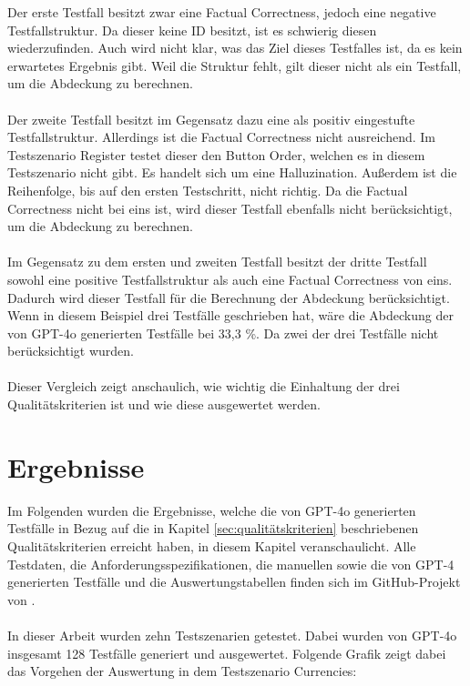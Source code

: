 \documentclass[12pt,toc=bib,toc=listof]{scrreprt}
\begin{document}
\noindent Der erste Testfall besitzt zwar eine Factual Correctness, jedoch eine negative Testfallstruktur. Da dieser keine ID besitzt, ist es schwierig diesen wiederzufinden. Auch wird nicht klar, was das Ziel dieses Testfalles ist, da es kein erwartetes Ergebnis gibt. Weil die Struktur fehlt, gilt dieser nicht als ein Testfall, um die Abdeckung zu berechnen.\\
\\
Der zweite Testfall besitzt im Gegensatz dazu eine als positiv eingestufte Testfallstruktur. Allerdings ist die Factual Correctness nicht ausreichend. Im Testszenario Register testet dieser den Button \glqq Order\grqq, welchen es in diesem Testszenario nicht gibt. Es handelt sich um eine Halluzination. Außerdem ist die Reihenfolge, bis auf den ersten Testschritt, nicht richtig. Da die Factual Correctness nicht bei eins ist, wird dieser Testfall ebenfalls nicht berücksichtigt, um die Abdeckung zu berechnen.\\
\\
Im Gegensatz zu dem ersten und zweiten Testfall besitzt der dritte Testfall sowohl eine positive Testfallstruktur als auch eine Factual Correctness von eins. Dadurch wird dieser Testfall für die Berechnung der Abdeckung berücksichtigt. Wenn in diesem Beispiel \textcite{Pavankumar21github2022} drei Testfälle geschrieben hat, wäre die Abdeckung der von GPT-4o generierten Testfälle bei 33,3 \%. Da zwei der drei Testfälle nicht berücksichtigt wurden.\\
\\
Dieser Vergleich zeigt anschaulich, wie wichtig die Einhaltung der drei Qualitätskriterien ist und wie diese ausgewertet werden.


\chapter{Ergebnisse} %
\label{sec:ergebnisse}
Im Folgenden wurden die Ergebnisse, welche die von GPT-4o generierten Testfälle in Bezug auf die in Kapitel \ref{sec:qualitätskriterien} beschriebenen Qualitätskriterien erreicht haben, in diesem Kapitel veranschaulicht. Alle Testdaten, die Anforderungsspezifikationen, die manuellen sowie die von GPT-4 generierten Testfälle und die Auswertungstabellen finden sich im GitHub-Projekt von \textcite{Müller2025}.\\
\\
In dieser Arbeit wurden zehn Testszenarien getestet. Dabei wurden von GPT-4o insgesamt 128 Testfälle generiert und ausgewertet. Folgende Grafik zeigt dabei das Vorgehen der Auswertung in dem Testszenario \glqq Currencies\grqq{}:
\end{document}
